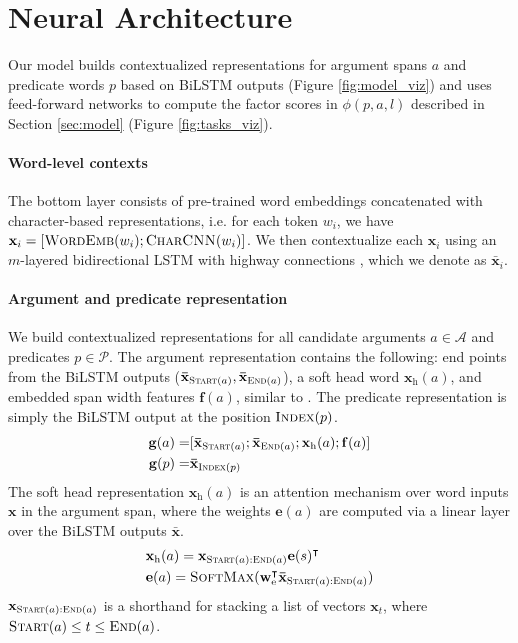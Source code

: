 \documentclass[11pt,a4paper]{article}
\begin{document}
 \section{Neural Architecture}\label{sec:arch}
Our model builds contextualized representations for argument spans $a$ and predicate words $p$ based on BiLSTM outputs (Figure \ref{fig:model_viz}) and uses feed-forward networks to compute the factor scores in $\phi(p,a,l)$ described in Section \ref{sec:model} (Figure \ref{fig:tasks_viz}). 

\paragraph{Word-level contexts}
The bottom layer consists of pre-trained word embeddings concatenated with character-based representations, i.e. for each token $w_i$, we have
$\mathbf{x}_i = [\textsc{WordEmb}(w_i); \textsc{CharCNN}(w_i)]$.
We then contextualize each $\mathbf{x}_i$ using an $m$-layered bidirectional LSTM with highway connections \cite{zhang2016highway}, which we denote as $\mathbf{\bar{x}}_i$.

\paragraph{Argument and predicate representation}
We build contextualized representations for all candidate arguments $a\in\mathcal{A}$ and predicates $p\in\mathcal{P}$.
The argument representation contains the following: end points from the BiLSTM outputs ($\mathbf{\bar{x}}_{\textsc{Start}(a)}, \mathbf{\bar{x}}_{\textsc{End}(a)}$), a soft head word $\mathbf{x}_{\text{h}}(a)$, and embedded span width features $\mathbf{f}(a)$, similar to . The predicate representation is simply the BiLSTM output at the position $\textsc{Index}(p)$.
\begin{align}
    \mathbf{g}(a) =& [\mathbf{\bar{x}}_{\textsc{Start}(a)}; \mathbf{\bar{x}}_{\textsc{End}(a)};
    \mathbf{x}_{\text{h}}(a); \mathbf{f}(a)] \\
    \mathbf{g}(p) =& \mathbf{\bar{x}}_{\textsc{Index}(p)}
\end{align}
The soft head representation $\mathbf{x}_{\text{h}}(a)$ is an attention mechanism over word inputs $\mathbf{x}$ in the argument span, where the weights $\mathbf{e}(a)$ are computed via a linear layer over the BiLSTM outputs $\mathbf{\bar{x}}$.
\begin{align}
    &\mathbf{x}_{\text{h}}(a) =  \mathbf{x}_{\textsc{Start}(a):\textsc{End}(a)}\mathbf{e}(s)^\intercal \\
    &\mathbf{e}(a) = \textsc{SoftMax} (\mathbf{w}_{\text{e}}^\intercal  \mathbf{\bar{x}}_{\textsc{Start}(a):\textsc{End}(a)})
\end{align}
$\mathbf{x}_{\textsc{Start}(a):\textsc{End}(a)}$ is a shorthand for stacking a list of vectors $\mathbf{x}_t$, where $\textsc{Start}(a)\leq t \leq \textsc{End}(a)$.
\end{document}
